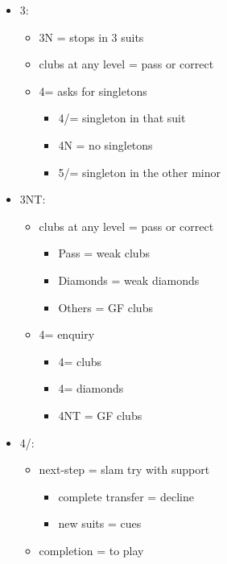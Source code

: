 \documentclass[a4paper,14pt]{extarticle}
\begin{document}
\begin{itemize}
\item 3\spades:
	\begin{itemize}
	\item 3N = stops in 3 suits
	\item clubs at any level = pass or correct
	\item 4\diamonds = asks for singletons
		\begin{itemize}
		\item 4\hearts/\spades = singleton in that suit
		\item 4N = no singletons
		\item 5\clubs/\diamonds = singleton in the other minor
		\end{itemize}
	\end{itemize}

\item 3NT:
	\begin{itemize}
	\item clubs at any level = pass or correct
		\begin{itemize}
		\item Pass = weak clubs
		\item Diamonds = weak diamonds
		\item Others = GF clubs
		\end{itemize}
	\item 4\diamonds = enquiry
		\begin{itemize}
		\item 4\hearts = clubs
		\item 4\spades = diamonds
		\item 4NT = GF clubs
		\end{itemize}
	\end{itemize}

\newpage

\item 4\clubs/\diamonds:
	\begin{itemize}
	\item next-step = slam try with support
		\begin{itemize}
		\item complete transfer = decline
		\item new suits = cues
		\end{itemize}
	\item completion = to play
	\end{itemize}


\end{itemize}
\end{document}
